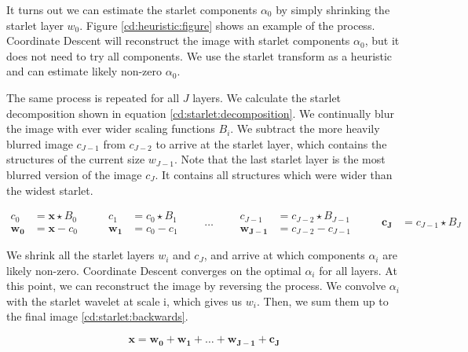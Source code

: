 It turns out we can estimate the starlet components $\alpha_0$ by simply shrinking the starlet layer $w_0$. Figure \ref{cd:heuristic:figure} shows an example of the process. Coordinate Descent will reconstruct the image with starlet components $\alpha_0$, but it does not need to try all components. We use the starlet transform as a heuristic and can estimate likely non-zero $\alpha_0$.

The same process is repeated for all $J$ layers. We calculate the starlet decomposition shown in equation \eqref{cd:starlet:decomposition}. We continually blur the image with ever wider scaling functions $B_i$. We subtract the more heavily blurred image $ c_{J-1}$ from $c_{J-2}$ to arrive at the starlet layer, which contains the structures of the current size $w_{J-1}$. Note that the last starlet layer is the most blurred version of the image $c_J$. It contains all structures which were wider than the widest starlet.

\begin{equation}\label{cd:starlet:decomposition}
\begin{split}
c_0 &= \bm{x} \star B_0 \\
\bm{w_0} &= \bm{x} - c_0
\end{split}
\qquad
\begin{split}
c_1 &= c_0 \star B_1 \\
\bm{w_1} &= c_0 - c_1
\end{split}
\qquad \ldots \qquad
\begin{split}
c_{J-1} &= c_{J-2} \star B_{J-1} \\
\bm{w_{J-1}} &= c_{J-2} - c_{J-1}
\end{split}
\qquad
\begin{split}
\bm{c_J} &= c_{J-1} \star B_J
\end{split}
\end{equation}

We shrink all the starlet layers $w_i$ and $c_J$, and arrive at which components $\alpha_i$ are likely non-zero. Coordinate Descent converges on the optimal $\alpha_i$ for all layers. At this point, we can reconstruct the image by reversing the process. We convolve $\alpha_i$ with the starlet wavelet at scale i, which gives us $w_i$. Then, we sum them up to the final image \eqref{cd:starlet:backwards}.

\begin{equation} \label{cd:starlet:backwards}
\bm{x} = \bm{w_0} + \bm{w_1} + \ldots + \bm{w_{J-1}} + \bm{c_J}
\end{equation}

